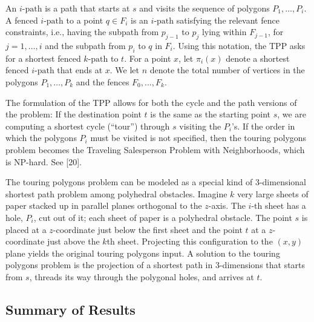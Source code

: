 \documentclass[a4paper]{article}
\begin{document}
An \(i\text{-path}\) is a path that starts at \(s\) and visits the sequence of polygons \(P_1, \dots, P_i\). A fenced \(i\text{-path}\) to a point \(q \in F_i\) is an \(i\text{-path}\) satisfying the relevant fence constraints, i.e., having the subpath from \(p_{j - 1}\) to \(p_j\) lying within \(F_{j - 1}\), for \(j = 1, \dots, i\) and the subpath from \(p_i\) to \(q\) in \(F_i\). Using this notation, the TPP asks for a shortest fenced \(k\text{-path}\) to \(t\). For a point \(x\), let \(\pi_i(x)\) denote a shortest fenced \(i\text{-path}\) that ends at \(x\). We let \(n\) denote the total number of vertices in the polygons \(P_1, \dots, P_k\) and the fences \(F_0, \dots, F_k\). 

The formulation of the TPP allows for both the cycle and the path versions of the problem: If the destination point \(t\) is the same as the starting point \(s\), we are computing a shortest cycle (“tour”) through \(s\) visiting the \(P_i\)'s. If the order in which the polygons \(P_i\) must be visited is not specified, then the touring polygons problem becomes the Traveling Salesperson Problem with Neighborhoods, which is NP-hard. See [20].

The touring polygons problem can be modeled as a special kind of 3-dimensional shortest path problem among polyhedral obstacles. Imagine \(k\) very large sheets of paper stacked up in parallel planes orthogonal to the \(z\)-axis. The \(i\)-th sheet has a hole, \(P_i\), cut out of it; each sheet of paper is a polyhedral obstacle. The point \(s\) is placed at a \(z\)-coordinate just below the first sheet and the point \(t\) at a \(z\)-coordinate just above the \(k\)th sheet. Projecting this configuration to the \((x, y)\) plane yields the original touring polygons input. A solution to the touring polygons problem is the projection of a shortest path in 3-dimensions that starts from \(s\), threads its way through the polygonal holes, and arrives at \(t\).

\subsection{Summary of Results}
\end{document}

